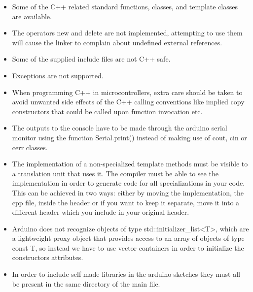 \begin{refsection}
\begin{itemize}
	\item Some of the C++ related standard functions, classes, and template classes are available.
	\item The operators new and delete are not implemented, attempting to use them will cause the linker to complain about undefined external references.
	\item Some of the supplied include files are not C++ safe.
	\item Exceptions are not supported.
	\item When programming C++ in microcontrollers, extra care should be taken to avoid unwanted side effects of the C++ calling conventions like implied copy constructors that could be called upon function invocation etc.
	\item The outputs to the console have to be made through the arduino serial monitor using the function Serial.print() instead of making use of cout, cin or cerr classes.
	\item  The implementation of a non-specialized template methods must be visible to a translation unit that uses it. The compiler must be able to see the implementation in order to generate code for all specializations in your code. This can be achieved in two ways: either by moving the implementation, the cpp file, inside the header or if you want to keep it separate, move it into a different header which you include in your original header.
	\item Arduino does not recognize objects of type std::initializer\_list<T>, which are a lightweight proxy object that provides access to an array of objects of type const T, so instead we have to use vector containers in order to initialize the constructors attributes.
	\item In order to include self made libraries in the arduino sketches they must all be present in the same directory of the main file.
	
\end{itemize}





\end{refsection}
